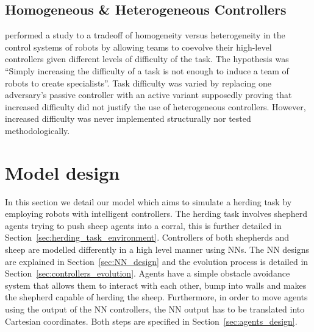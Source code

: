 \documentclass[conference]{IEEEtran}
\begin{document}
\subsection{Homogeneous \& Heterogeneous Controllers}
\cite{potter2001heterogeneity} performed a study to a tradeoff of homogeneity versus heterogeneity in the control systems of robots by allowing teams to coevolve their high-level controllers given different levels of difficulty of the task.
The hypothesis was ``Simply increasing the difficulty of a task is not enough to induce a team of robots to create specialists''.
Task difficulty was varied by replacing one adversary's passive controller with an active variant supposedly proving that increased difficulty did not justify the use of heterogeneous controllers.
However, increased difficulty was never implemented structurally nor tested methodologically. 

\section{Model design}
\label{sec:model_design}
In this section we detail our model which aims to simulate a herding task by employing robots with intelligent controllers.
The herding task involves shepherd agents trying to push sheep agents into a corral, this is further detailed in Section~\ref{sec:herding_task_environment}.
Controllers of both shepherds and sheep are modelled differently in a high level manner using NNs.
The NN designs are explained in Section~\ref{sec:NN_design} and the evolution process is detailed in Section~\ref{sec:controllers_evolution}.
Agents have a simple obstacle avoidance system that allows them to interact with each other, bump into walls and makes the shepherd capable of herding the sheep.
Furthermore, in order to move agents using the output of the NN controllers, the NN output has to be translated into Cartesian coordinates.
Both steps are specified in Section~\ref{sec:agents_design}.
\end{document}

